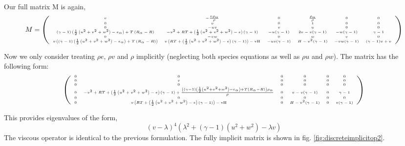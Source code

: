 Our full matrix M is again,
\begin{equation}
\tiny
M = 
\left(
\begin{array}{cccccc}
 v & -\frac{v \rho _{\alpha }}{\rho } & 0 & \frac{\rho _{\alpha }}{\rho } & 0 & 0 \\
 0 & v & 0 & 1 & 0 & 0 \\
 0 & -u v & v & u & 0 & 0 \\
 (\gamma -1) \left(\frac{1}{2} \left(u^2+v^2+w^2\right)-e_{\alpha }\right)+T \left(R_{\alpha }-R\right) & -v^2+R T+\left(\frac{1}{2} \left(u^2+v^2+w^2\right)-e\right) (\gamma
   -1) & -u (\gamma -1) & 2 v-v (\gamma -1) & -w (\gamma -1) & \gamma -1 \\
 0 & -v w & 0 & w & v & 0 \\
 v \left((\gamma -1) \left(\frac{1}{2} \left(u^2+v^2+w^2\right)-e_{\alpha }\right)+T \left(R_{\alpha }-R\right)\right) & v \left(R T+\left(\frac{1}{2}
   \left(u^2+v^2+w^2\right)-e\right) (\gamma -1)\right)-\text{vH} & -u v (\gamma -1) & H-v^2 (\gamma -1) & -v w (\gamma -1) & (\gamma -1) v+v
\end{array}
\right)
\end{equation}

Now we only consider treating $\rho e$, $\rho v$ and $\rho$ implicitly
(neglecting both species equations as well as $\rho u$ and $\rho
w$). The matrix has the following form:
\begin{equation}
\tiny
\left(
\begin{array}{cccccc}
 0 & 0 & 0 & 0 & 0 & 0 \\
 0 & v & 0 & 0 & 0 & 0 \\
 0 & 0 & 0 & 0 & 0 & 0 \\
 0 & -v^2+R T+\left(\frac{1}{2} \left(u^2+v^2+w^2\right)-e\right) (\gamma -1)+\frac{\left((\gamma -1) \left(\frac{1}{2} \left(u^2+v^2+w^2\right)-e_{\alpha }\right)+T \left(R_{\alpha
   }-R\right)\right) \rho _{\alpha }}{\rho } & 0 & v-v (\gamma -1) & 0 & \gamma -1 \\
 0 & 0 & 0 & 0 & 0 & 0 \\
 0 & v \left(R T+\left(\frac{1}{2} \left(u^2+v^2+w^2\right)-e\right) (\gamma -1)\right)-\text{vH} & 0 & H-v^2 (\gamma -1) & 0 & v (\gamma -1)
\end{array}
\right)
\end{equation}

This provides eigenvalues of the form, 
\begin{equation}
(v-\lambda )^4 \left(\lambda ^2+(\gamma -1) \left(u^2+w^2\right)-\lambda  v\right)
\end{equation}
The viscous operator is identical to the previous
formulation. The fully implicit matrix is shown in fig. \ref{fig:discreteimplicitop2}.

